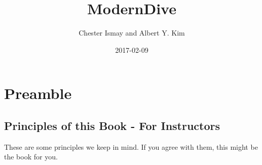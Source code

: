 \documentclass[]{tufte-book}
\title{ModernDive}
\author{Chester Ismay and Albert Y. Kim}
\date{2017-02-09}
\begin{document}
\let\allcaps=\relax
\maketitle



{
\setcounter{tocdepth}{1}
\tableofcontents
}

\chapter{Preamble}\label{preamble}

\section{Principles of this Book - For
Instructors}\label{principles-of-this-book---for-instructors}

These are some principles we keep in mind. If you agree with them, this
might be the book for you.
\end{document}
